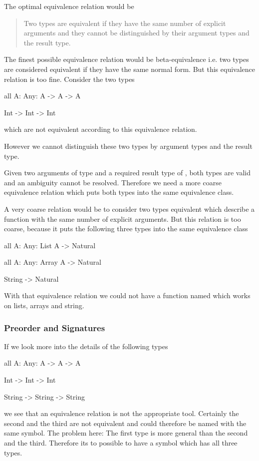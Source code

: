 The optimal equivalence relation would be

\begin{quote}
    Two types are equivalent if they have the same number of explicit arguments
    and they cannot be distinguished by their argument types and the result
    type.
\end{quote}

The finest possible equivalence relation would be beta-equivalence i.e. two
types are considered equivalent if they have the same normal form. But this
equivalence relation is too fine. Consider the two types
%
\begin{alba}
    all {A: Any}: A -> A -> A

    Int -> Int -> Int
\end{alba}
%
which are not equivalent according to this equivalence relation.

However we cannot distinguish these two types by argument types and the result
type.

Given two arguments of type  and a required result type of ,
both types are valid and an ambiguity cannot be resolved. Therefore we need a
more coarse equivalence relation which puts both types into the same equivalence
class.

A very coarse relation would be to consider two types equivalent which describe
a function with the same number of explicit arguments. But this relation is too
coarse, because it puts the following three types into the same equivalence class
%
\begin{alba}
    all {A: Any}: List A -> Natural

    all {A: Any}: Array A -> Natural

    String -> Natural
\end{alba}
%
With that equivalence relation we could not have a function named 
which works on lists, arrays and string.



\subsubsection{Preorder and Signatures}

If we look more into the details of the following types
%
\begin{alba}
    all {A: Any}: A -> A -> A

    Int -> Int -> Int

    String -> String -> String
\end{alba}
%
we see that an equivalence relation is not the appropriate tool. Certainly the
second and the third are not equivalent and could therefore be named with the
same symbol. The problem here: The first type is more general than the second
and the third. Therefore its to possible to have a symbol which has all three
types.


